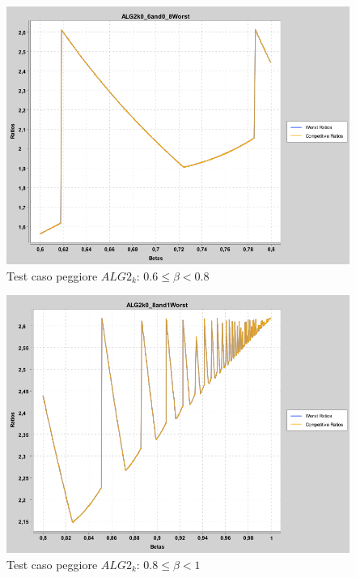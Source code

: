 \documentclass[12pt]{article}
\begin{document}
\begin{figure}[H]
\caption{Test caso peggiore $ALG2_{k}$: $0.6 \leq \beta < 0.8$}
\centering
\includegraphics[scale=0.4]{worst/ALG2k0_6and0_8Worst.png}
\end{figure}
\begin{figure}[H]
\caption{Test caso peggiore $ALG2_{k}$: $0.8 \leq \beta < 1$}
\centering
\includegraphics[scale=0.4]{worst/ALG2k0_8and1Worst.png}
\end{figure}
\end{document}
